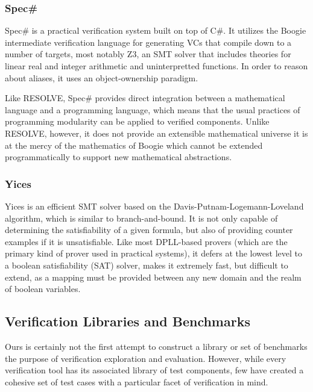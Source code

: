 \subsubsection{Spec\#}\label{sec:SpecSharp}
Spec\# is a practical verification system built on top of C\#.  It utilizes the Boogie intermediate verification language for generating VCs that compile down to a number of targets, most notably Z3, an SMT solver that includes theories for linear real and integer arithmetic and uninterpretted functions.  In order to reason about aliases, it uses an object-ownership paradigm.

Like RESOLVE, Spec\# provides direct integration between a mathematical language and a programming language, which means that the usual practices of programming modularity can be applied to verified components.  Unlike RESOLVE, however, it does not provide an extensible mathematical universe it is at the mercy of the mathematics of Boogie which cannot be extended programmatically to support new mathematical abstractions.

\subsubsection{Yices}\label{sec:Yices}
Yices is an efficient SMT solver based on the Davis-Putnam-Logemann-Loveland\cite{DPLL} algorithm, which is similar to branch-and-bound.  It is not only capable of determining the satisfiability of a given formula, but also of providing counter examples if it is unsatisfiable.  Like most DPLL-based provers (which are the primary kind of prover used in practical systems), it defers at the lowest level to a boolean satisfiability (SAT) solver, makes it extremely fast, but difficult to extend, as a mapping must be provided between any new domain and the realm of boolean variables.

\subsection{Verification Libraries and Benchmarks}\label{sec:libraries}
Ours is certainly not the first attempt to construct a library or set of benchmarks the purpose of verification exploration and evaluation.  However, while every verification tool has its associated library of test components, few have created a cohesive set of test cases with a particular facet of verification in mind.

